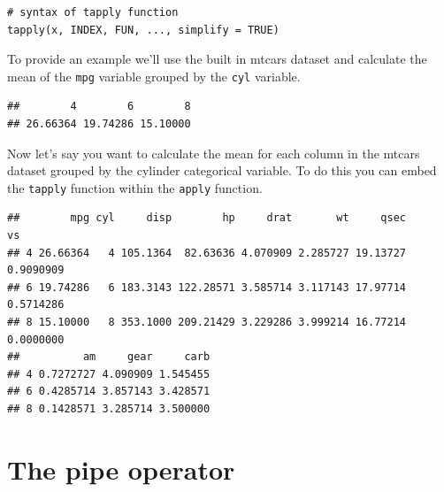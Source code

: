 \documentclass[
]{book}
\newenvironment{Shaded}{\begin{snugshade}}{\end{snugshade}}
\newcommand{\ControlFlowTok}[1]{\textcolor[rgb]{0.13,0.29,0.53}{\textbf{#1}}}
\newcommand{\DecValTok}[1]{\textcolor[rgb]{0.00,0.00,0.81}{#1}}
\newcommand{\FunctionTok}[1]{\textcolor[rgb]{0.00,0.00,0.00}{#1}}
\newcommand{\NormalTok}[1]{#1}
\newcommand{\SpecialCharTok}[1]{\textcolor[rgb]{0.00,0.00,0.00}{#1}}
\theoremstyle{definition}
\theoremstyle{definition}
\theoremstyle{definition}
\theoremstyle{definition}
\theoremstyle{remark}
\begin{document}
\begin{verbatim}
# syntax of tapply function
tapply(x, INDEX, FUN, ..., simplify = TRUE)
\end{verbatim}

To provide an example we'll use the built in mtcars dataset and calculate the mean of the \texttt{mpg} variable grouped by the \texttt{cyl} variable.

\begin{Shaded}
\end{Shaded}

\begin{verbatim}
##        4        6        8 
## 26.66364 19.74286 15.10000
\end{verbatim}

Now let's say you want to calculate the mean for each column in the mtcars dataset grouped by the cylinder categorical variable. To do this you can embed the \texttt{tapply} function within the \texttt{apply} function.

\begin{Shaded}
\end{Shaded}

\begin{verbatim}
##        mpg cyl     disp        hp     drat       wt     qsec        vs
## 4 26.66364   4 105.1364  82.63636 4.070909 2.285727 19.13727 0.9090909
## 6 19.74286   6 183.3143 122.28571 3.585714 3.117143 17.97714 0.5714286
## 8 15.10000   8 353.1000 209.21429 3.229286 3.999214 16.77214 0.0000000
##          am     gear     carb
## 4 0.7272727 4.090909 1.545455
## 6 0.4285714 3.857143 3.428571
## 8 0.1428571 3.285714 3.500000
\end{verbatim}

\hypertarget{the-pipe-operator}{%
\section{The pipe operator}\label{the-pipe-operator}}
\end{document}
